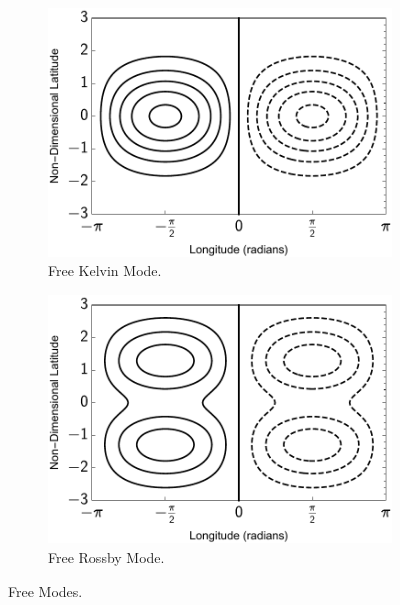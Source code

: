 \begin{figure}
  \centering
  \begin{subfigure}[b]{0.49\textwidth}
    \includegraphics[width=1.0\textwidth]{figures/wave-mean-flow/free-kelvin-mode.pdf}
    \caption{Free Kelvin Mode.}
    \label{fig:free-kelvin-mode}
  \end{subfigure}
  \begin{subfigure}[b]{0.49\textwidth}
    \includegraphics[width=1.0\textwidth]{figures/wave-mean-flow/free-rossby-mode.pdf}
    \caption{Free Rossby Mode.}
    \label{fig:free-rossby-mode}
  \end{subfigure}
  \caption{Free Modes.}
  \label{fig:free-kelvin-rossby-mode}
\end{figure}



